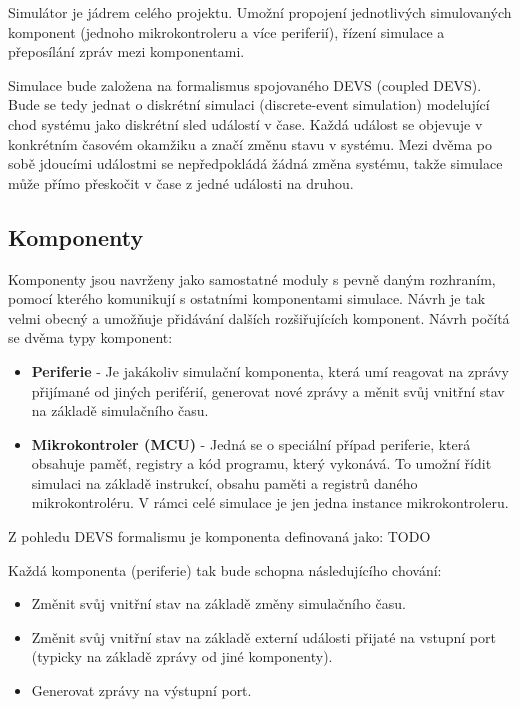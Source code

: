 Simulátor je jádrem celého projektu. Umožní propojení jednotlivých simulovaných komponent (jednoho mikrokontroleru a více periferií), řízení simulace
a přeposílání zpráv mezi komponentami.

Simulace bude založena na formalismus spojovaného DEVS (coupled DEVS). Bude se tedy jednat o diskrétní simulaci (discrete-event simulation) 
modelující chod systému jako diskrétní sled událostí v čase. Každá událost se objevuje v konkrétním časovém okamžiku a značí změnu stavu v systému.
Mezi dvěma po sobě jdoucími událostmi se nepředpokládá žádná změna systému, takže simulace může přímo přeskočit v čase z jedné události na druhou.

\subsection{Komponenty}

Komponenty jsou navrženy jako samostatné moduly s pevně daným rozhraním, pomocí kterého komunikují s ostatními komponentami simulace. Návrh je
tak velmi obecný a umožňuje přidávání dalších rozšiřujících komponent.
Návrh počítá se dvěma typy komponent:

\begin{itemize}
\item \textbf{Periferie} - Je jakákoliv simulační komponenta, která umí reagovat na zprávy přijímané od jiných periférií, generovat nové zprávy a měnit svůj vnitřní stav na základě simulačního času.
\item \textbf{Mikrokontroler (MCU)} - Jedná se o speciální případ periferie, která obsahuje paměť, registry a kód programu, který vykonává.
To umožní řídit simulaci na základě instrukcí, obsahu paměti a registrů daného mikrokontroléru.  V rámci celé simulace je jen jedna instance mikrokontroleru. 
\end{itemize}

Z pohledu DEVS formalismu je komponenta definovaná jako: TODO

Každá komponenta (periferie) tak bude schopna následujícího chování:

\begin{itemize}
\item Změnit svůj vnitřní stav na základě změny simulačního času.
\item Změnit svůj vnitřní stav na základě externí události přijaté na vstupní port (typicky na základě zprávy od jiné komponenty).
\item Generovat zprávy na výstupní port.
\end{itemize}

